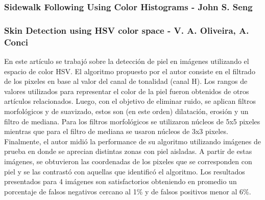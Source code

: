 	\subsubsection{Sidewalk Following Using Color Histograms - John S. Seng}
	\subsubsection{Skin Detection using HSV color space - V. A. Oliveira, A. Conci}
	En este artículo se trabajó sobre la detección de piel en imágenes utilizando el espacio de color HSV. El algoritmo propuesto 
por el autor consiste en el filtrado de los pixeles en base al valor del canal de tonalidad (canal H). Los rangos de valores utilizados para 
representar el color de la piel fueron obtenidos de otros artículos relacionados. Luego, con el objetivo de eliminar ruido, se aplican filtros morfológicos y de suavizado, estos son (en este orden) dilatación, erosión y un filtro de mediana. Para los filtros morfológicos se utilizaron núcleos de 5x5 pixeles mientras que para el filtro de mediana se usaron núcleos de 3x3 pixeles. Finalmente, el autor midió la performance de su algoritmo utilizando imágenes de prueba en donde se aprecian distintas zonas con piel aisladas. A partir de estas imágenes, se obtuvieron las coordenadas de los pixeles que se corresponden con piel y se las contrastó con aquellas que identificó el algoritmo. Los resultados presentados para 4 imágenes son satisfactorios obteniendo en promedio un porcentaje de falsos negativos cercano al 1\% y de falsos positivos menor al 6\%.

